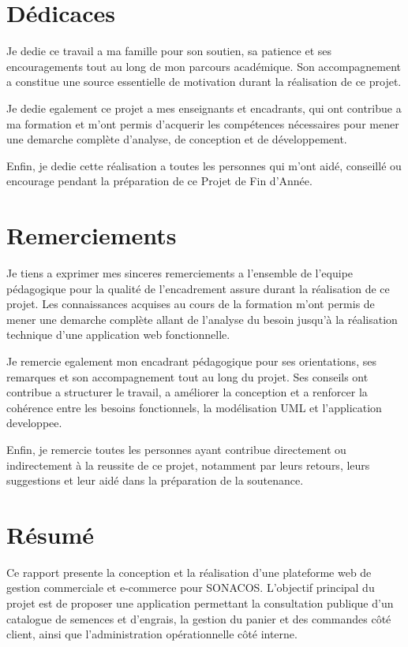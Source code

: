 \documentclass[12pt,a4paper]{report}
\begin{document}

\chapter*{Dédicaces}

Je dedie ce travail a ma famille pour son soutien, sa patience et ses encouragements tout au long de mon parcours académique. Son accompagnement a constitue une source essentielle de motivation durant la réalisation de ce projet.

Je dedie egalement ce projet a mes enseignants et encadrants, qui ont contribue a ma formation et m'ont permis d'acquerir les compétences nécessaires pour mener une demarche complète d'analyse, de conception et de développement.

Enfin, je dedie cette réalisation a toutes les personnes qui m'ont aidé, conseillé ou encourage pendant la préparation de ce Projet de Fin d'Année.

\chapter*{Remerciements}

Je tiens a exprimer mes sinceres remerciements a l'ensemble de l'equipe pédagogique pour la qualité de l'encadrement assure durant la réalisation de ce projet. Les connaissances acquises au cours de la formation m'ont permis de mener une demarche complète allant de l'analyse du besoin jusqu'à la réalisation technique d'une application web fonctionnelle.

Je remercie egalement mon encadrant pédagogique pour ses orientations, ses remarques et son accompagnement tout au long du projet. Ses conseils ont contribue a structurer le travail, a améliorer la conception et a renforcer la cohérence entre les besoins fonctionnels, la modélisation UML et l'application developpee.

Enfin, je remercie toutes les personnes ayant contribue directement ou indirectement à la reussite de ce projet, notamment par leurs retours, leurs suggestions et leur aidé dans la préparation de la soutenance.

\chapter*{Résumé}

Ce rapport presente la conception et la réalisation d'une plateforme web de gestion commerciale et e-commerce pour SONACOS. L'objectif principal du projet est de proposer une application permettant la consultation publique d'un catalogue de semences et d'engrais, la gestion du panier et des commandes côté client, ainsi que l'administration opérationnelle côté interne.
\end{document}

